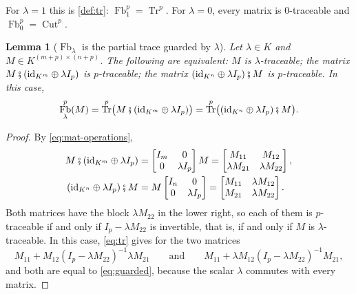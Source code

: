 \documentclass[11pt,a4paper]{article}
\theoremstyle{plain}
\newtheorem{lemma}[theorem]{Lemma}
\theoremstyle{definition}
\theoremstyle{remark}
\DeclareMathOperator{\Fb}{Fb}
\DeclareMathOperator{\Tr}{Tr}
\DeclareMathOperator{\Cut}{Cut}
\newcommand{\id}{\mathrm{id}}
\newcommand{\then}{\mathbin{\fatsemi}}
\begin{document}
For $\lambda = 1$ this is \cref{def:tr}: $\Fb_1^p = \Tr^p$.
For $\lambda = 0$, every matrix is $0$-traceable and $\Fb_0^p = \Cut^p$.

\begin{lemma}[$\Fb_\lambda$ is the partial trace guarded by $\lambda$]
    \label{lem:guard}
    Let $\lambda \in K$ and $M \in K^{(m+p) \times (n+p)}$.
    The following are equivalent: $M$ is $\lambda$-traceable; the matrix $M \then (\id_{K^m} \oplus \lambda I_p)$ is $p$-traceable; the matrix $(\id_{K^n} \oplus \lambda I_p) \then M$ is $p$-traceable.
    In this case,
    \begin{equation}
        \label{eq:guard}
        \Fb_\lambda^p(M) = \Tr^p\bigl( M \then (\id_{K^m} \oplus \lambda I_p) \bigr) = \Tr^p\bigl( (\id_{K^n} \oplus \lambda I_p) \then M \bigr) .
    \end{equation}
\end{lemma}

\begin{proof}
    By \cref{eq:mat-operations},
    \begin{align*}
        M \then (\id_{K^m} \oplus \lambda I_p) & = \begin{bmatrix} I_m & 0 \\ 0 & \lambda I_p \end{bmatrix} M = \begin{bmatrix} M_{11} & M_{12} \\ \lambda M_{21} & \lambda M_{22} \end{bmatrix}, \\
        (\id_{K^n} \oplus \lambda I_p) \then M & = M \begin{bmatrix} I_n & 0 \\ 0 & \lambda I_p \end{bmatrix} = \begin{bmatrix} M_{11} & \lambda M_{12} \\ M_{21} & \lambda M_{22} \end{bmatrix} .
    \end{align*}
    Both matrices have the block $\lambda M_{22}$ in the lower right, so each of them is $p$-traceable if and only if $I_p - \lambda M_{22}$ is invertible, that is, if and only if $M$ is $\lambda$-traceable.
    In this case, \cref{eq:tr} gives for the two matrices
    \begin{equation*}
        M_{11} + M_{12} (I_p - \lambda M_{22})^{-1} \lambda M_{21}
        \qquad \text{and} \qquad
        M_{11} + \lambda M_{12} (I_p - \lambda M_{22})^{-1} M_{21},
    \end{equation*}
    and both are equal to \cref{eq:guarded}, because the scalar $\lambda$ commutes with every matrix.
\end{proof}
\end{document}
